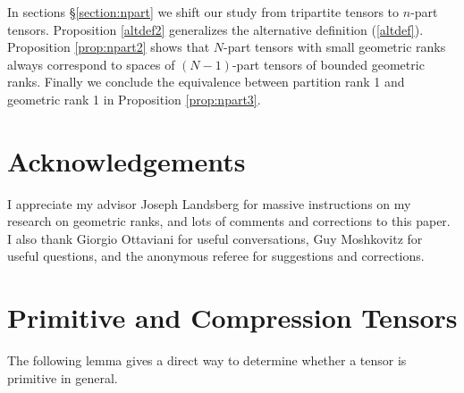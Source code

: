 \documentclass[10pt]{article} %
\theoremstyle{definition}
\begin{document}
In sections \S \ref{section:npart} we shift our study from tripartite tensors to $n$-part tensors. Proposition \ref{altdef2} generalizes the alternative definition (\ref{altdef}). Proposition \ref{prop:npart2} shows that $N$-part tensors with small geometric ranks always correspond to spaces of $(N-1)$-part tensors of bounded geometric ranks. Finally we conclude the equivalence between partition rank 1 and geometric rank 1 in Proposition \ref{prop:npart3}.

\section*{Acknowledgements}
I appreciate my advisor Joseph Landsberg for massive instructions on my research on geometric ranks, and lots of comments and corrections to this paper. I also thank Giorgio Ottaviani for useful conversations, Guy Moshkovitz for useful questions, and the anonymous referee for suggestions and corrections. 

\section{Primitive and Compression Tensors}\label{section:primitive}
The following lemma gives a direct way to determine whether a tensor is primitive in general.
\end{document}
